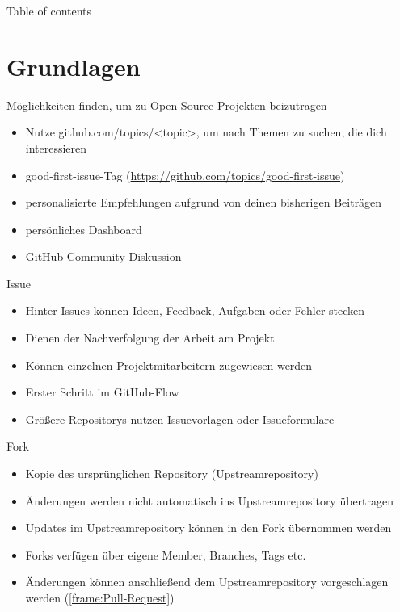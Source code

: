 \documentclass[compress,aspectratio=169]{beamer}
\begin{document}
	\begin{frame}[plain]
		\titlepage
	\end{frame}

	\begin{frame}[t]{Table of contents}
		\tableofcontents[subsectionstyle=hide/hide]
	\end{frame}


	\section{Grundlagen}

	\begin{frame}{Möglichkeiten finden, um zu Open-Source-Projekten beizutragen}
		\begin{itemize}
			\item Nutze github.com/topics/<topic>, um nach Themen zu suchen, die dich interessieren
            \item good-first-issue-Tag (\href{https://github.com/topics/good-first-issue}{https://github.com/topics/good-first-issue})
            \item personalisierte Empfehlungen aufgrund von deinen bisherigen Beiträgen
            \item persönliches Dashboard
            \item GitHub Community Diskussion
		\end{itemize}
	\end{frame}
    \begin{frame}{Issue}
		\begin{itemize}
			\item Hinter Issues können Ideen, Feedback, Aufgaben oder Fehler stecken
            \item Dienen der Nachverfolgung der Arbeit am Projekt
            \item Können einzelnen Projektmitarbeitern zugewiesen werden
            \item Erster Schritt im GitHub-Flow
            \item Größere Repositorys nutzen Issuevorlagen oder Issueformulare
		\end{itemize}
	\end{frame}
 \begin{frame}{Fork}
		\begin{itemize}
            	\item Kopie des ursprünglichen Repository (Upstreamrepository)
               \item Änderungen werden nicht automatisch ins Upstreamrepository übertragen
               \item Updates im Upstreamrepository können in den Fork übernommen werden
               \item Forks verfügen über eigene Member, Branches, Tags etc.
               \item Änderungen können anschließend dem Upstreamrepository vorgeschlagen werden (\ref{frame:Pull-Request})
		\end{itemize}
\end{frame}
\end{document}
